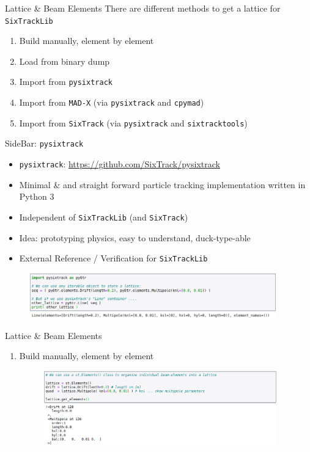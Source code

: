 \documentclass{beamer}
\begin{document}
\begin{frame}{Lattice \& Beam Elements}
There are different methods to get a lattice for \texttt{SixTrackLib}
\begin{enumerate}
    \item Build manually, element by element
    \item Load from binary dump 
    \item Import from \texttt{pysixtrack} \value{mysavedenumi}
    \item Import from \texttt{MAD-X} (via \texttt{pysixtrack} and \texttt{cpymad})
    \item Import from \texttt{SixTrack} (via \texttt{pysixtrack} and \texttt{sixtracktools})
\end{enumerate}
\end{frame}

\begin{frame}{SideBar: \texttt{pysixtrack}}
    \begin{itemize}
        \item \texttt{pysixtrack}: \url{https://github.com/SixTrack/pysixtrack}
        \item Minimal \& and straight forward particle tracking implementation written in Python 3 
        \item Independent of \texttt{SixTrackLib} (and \texttt{SixTrack})
        \item Idea: prototyping physics, easy to understand, duck-type-able 
        \item External Reference / Verification for \texttt{SixTrackLib}
    \end{itemize}
    \begin{figure}[h]
        \centering
        \includegraphics[width=0.95\textwidth]{images/pysixtrack_01.png}
    \end{figure}
\end{frame}

\begin{frame}{Lattice \& Beam Elements}
\begin{enumerate}
    \item Build manually, element by element
    \begin{figure}[h]
        \centering
        \includegraphics[width=0.95\textwidth]{images/lattice_01.png}
    \end{figure}
\end{enumerate}
\end{frame}
\end{document}
